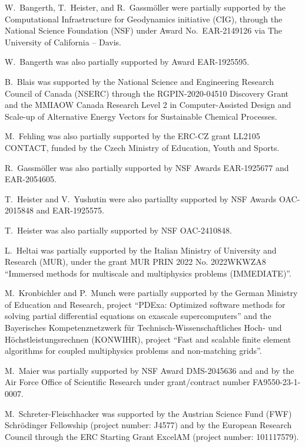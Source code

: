 \documentclass{ansarticle-preprint}
\begin{document}
W.~Bangerth, T.~Heister, and R.~Gassm\"{o}ller were partially
supported by the Computational Infrastructure for Geodynamics initiative
(CIG), through the National Science Foundation (NSF) under Award
No.~EAR-2149126 via The University of California -- Davis.

W.~Bangerth was also partially supported by Award EAR-1925595.

B.~Blais was supported by the National Science and Engineering Research Council of Canada (NSERC)  through the RGPIN-2020-04510 Discovery Grant and the MMIAOW Canada Research Level 2 in Computer-Assisted Design and Scale-up of Alternative Energy Vectors for Sustainable Chemical Processes.

M.~Fehling was also partially supported by the ERC-CZ grant LL2105
CONTACT, funded by the Czech Ministry of Education, Youth and Sports.

R.~Gassm\"{o}ller was also partially supported by NSF Awards EAR-1925677
and EAR-2054605.

T.~Heister and V.~Yushutin were also partiallty supported by NSF Awards OAC-2015848 and EAR-1925575.

T.~Heister was also partially supported by NSF OAC-2410848.

L.~Heltai was partially supported by the Italian Ministry of
University and Research (MUR), under the grant MUR PRIN 2022 No. 2022WKWZA8
``Immersed methods for multiscale and multiphysics problems (IMMEDIATE)''.


M.~Kronbichler and P.~Munch were partially supported by the
German Ministry of Education and Research, project
``PDExa: Optimized software methods for solving partial differential
equations on exascale supercomputers'' and the Bayerisches Kompetenznetzwerk
f\"ur Technisch-Wissen\-schaft\-li\-ches Hoch- und H\"ochstleistungsrechnen
(KONWIHR), project ``Fast and scalable finite element algorithms for coupled
multiphysics problems and non-matching grids''.

M.~Maier was partially supported by NSF Award DMS-2045636 and and by the
Air Force Office of Scientific Research under grant/contract number
FA9550-23-1-0007.


M.~Schreter-Fleischhacker was supported by the Austrian Science Fund (FWF) Schrödinger Fellowship (project number: J4577) and by the European Research Council
through the ERC Starting Grant ExcelAM (project number: 101117579).
\end{document}
